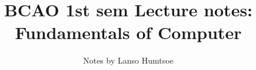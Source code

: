 \usepackage{amssymb, mathrsfs, enumitem}
\usepackage{tikz-cd}
\usepackage{multicol}
\usepackage{graphicx}
\usepackage{color}
\usepackage{amsthm}
\usepackage{hyperref}
\usepackage{verbatim}
\usepackage{caption}
\usepackage{subcaption}
\usepackage{amsmath, epsfig, colortbl}
\usepackage[breakable, skins]{tcolorbox}
\setlength{\parskip}{8pt}

\newtheorem{theorem}{Theorem}
\newtheorem{lemma}{Lemma}
\newtheorem{cor}{Corollary}
\theoremstyle{definition}
\newtheorem{prop}{Proposition}
\newtheorem{fact}{Fact}
\newtheorem{example}{Example}
\newtheorem{definition}{Definition}
\newenvironment{solution} {\paragraph{Solution.}}{\hfill$\square$}
\renewenvironment{proof} {\paragraph{Proof.}}{\hfill$\square$}
\renewcommand{\today}{}
\captionsetup{margin=.7in, format=hang}


\addtolength{\topmargin}{-.875in}
\addtolength{\oddsidemargin}{-.8in}
\addtolength{\textwidth}{2in}
\addtolength{\textheight}{2.15in}

\newcommand{\mc}{\mathcal}
\newcommand{\abs}[1]{\left| #1\right|}
\newcommand{\la}{\Leftarrow}
\newcommand{\ra}{\Rightarrow}
\renewcommand{\iff}{\Leftrightarrow}
\newcommand{\Z}{\mathbb{Z}}
\newcommand{\floor}[1]{\left\lfloor #1\right\rfloor}
\newcommand{\ceil}[1]{\left\lceil #1\right\rceil}

\newcommand{\ex}[1]{\begin{examplebox}\begin{example} #1 \end{example}\end{examplebox}}

\newcommand{\eps}{\epsilon}
\newcommand{\N}{\mathbb{N}}
\newcommand{\Q}{\mathbb{Q}}
\newcommand{\R}{\mathbb{R}}
\newcommand{\ba}{\backslash}

\def\cents{\hbox{\rm\rlap/c}}





\title{BCAO 1st sem Lecture notes: Fundamentals of Computer }
\author{Notes by Lanso Humtsoe}
\maketitle
